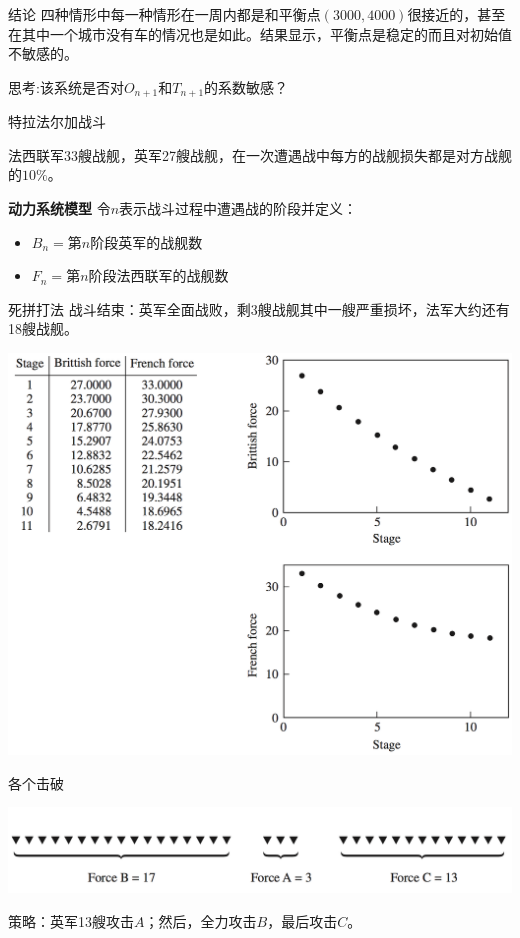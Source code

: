 \documentclass[UTF8]{ctexbeamer}
\begin{document}
\begin{frame}{结论}
  四种情形中每一种情形在一周内都是和平衡点$(3000,4000)$很接近的，甚至在其中一个城市没有车的情况也是如此。结果显示，平衡点是稳定的而且对初始值不敏感的。

  思考:该系统是否对$O_{n+1}$和$T_{n+1}$的系数敏感？

\end{frame}

\begin{frame}{特拉法尔加战斗}

  法西联军33艘战舰，英军27艘战舰，在一次遭遇战中每方的战舰损失都是对方战舰的$10\%$。

  {\bf{}动力系统模型} 令$n$表示战斗过程中遭遇战的阶段并定义：

  \begin{definition}
    \begin{itemize}
    \item $B_n = $第$n$阶段英军的战舰数
    \item $F_n = $第$n$阶段法西联军的战舰数
    \end{itemize}
  \end{definition}

\end{frame}

\begin{frame}{死拼打法}
  战斗结束：英军全面战败，剩3艘战舰其中一艘严重损坏，法军大约还有18艘战舰。
  \begin{center}
    \includegraphics[width=.6\textwidth{}]{fight-death.png}
  \end{center}
\end{frame}

\begin{frame}{各个击破}
  \begin{center}
    \includegraphics[width=.6\textwidth{}]{fight-france.png}
  \end{center}
  
  策略：英军13艘攻击$A$；然后，全力攻击$B$，最后攻击$C$。
  
\end{frame}
\end{document}
